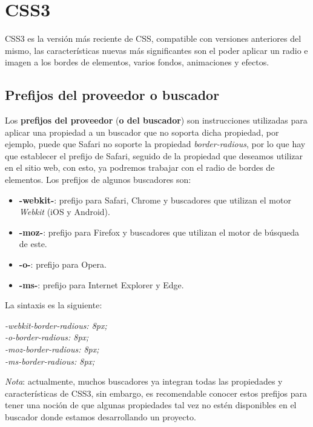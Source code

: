 \section{CSS3}

CSS3 es la versión más reciente de CSS, compatible con versiones anteriores del mismo, las características nuevas más significantes son el poder aplicar un radio e imagen a los bordes de elementos, varios fondos, animaciones y efectos.


\subsection{Prefijos del proveedor o buscador}

Los \textbf{prefijos del proveedor} (\textbf{o del buscador}) son instrucciones utilizadas para aplicar una propiedad a un buscador que no soporta dicha propiedad, por ejemplo, puede que Safari no soporte la propiedad \textit{border-radious}, por lo que hay que establecer el prefijo de Safari, seguido de la propiedad que deseamos utilizar en el sitio web, con esto, ya podremos trabajar con el radio de bordes de elementos. Los prefijos de algunos buscadores son:
\begin{itemize}
    \item \textbf{-webkit-}: prefijo para Safari, Chrome y buscadores que utilizan el motor \textit{Webkit} (iOS y Android).
    \item \textbf{-moz-}: prefijo para Firefox y buscadores que utilizan el motor de búsqueda de este.
    \item \textbf{-o-}: prefijo para Opera.
    \item \textbf{-ms-}: prefijo para Internet Explorer y Edge.
\end{itemize}

La sintaxis es la siguiente:
\begin{center}
    \textit{
        -webkit-border-radious: 8px; \\
        -o-border-radious: 8px; \\
        -moz-border-radious: 8px; \\
        -ms-border-radious: 8px; \\
    }
\end{center}

\textit{Nota}: actualmente, muchos buscadores ya integran todas las propiedades y características de CSS3, sin embargo, es recomendable conocer estos prefijos para tener una noción de que algunas propiedades tal vez no estén disponibles en el buscador donde estamos desarrollando un proyecto.


